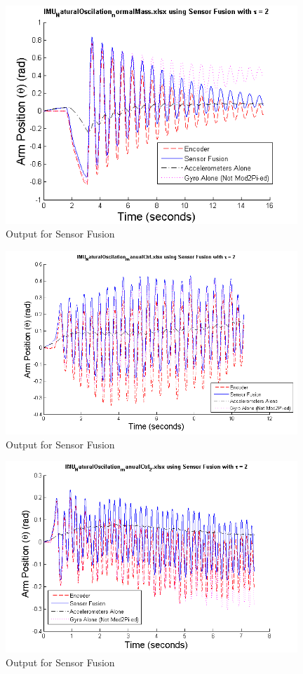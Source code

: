 \documentclass{article}
\theoremstyle{plain}
\theoremstyle{definition}
\theoremstyle{remark}
\begin{document}
\begin{figure}[hbt]
\begin{center}
\includegraphics[width = 11cm]{SF_out_3.png}
\caption{Output for Sensor Fusion}
\label{SF_out_3}
\end{center}
\end{figure}


\begin{figure}[hbt]
\begin{center}
\includegraphics[width = 11cm]{SF_out_5.png}
\caption{Output for Sensor Fusion}
\label{SF_out_5}
\end{center}
\end{figure}


\begin{figure}[hbt]
\begin{center}
\includegraphics[width = 11cm]{SF_out_4.png}
\caption{Output for Sensor Fusion}
\label{SF_out_4}
\end{center}
\end{figure}
\end{document}

